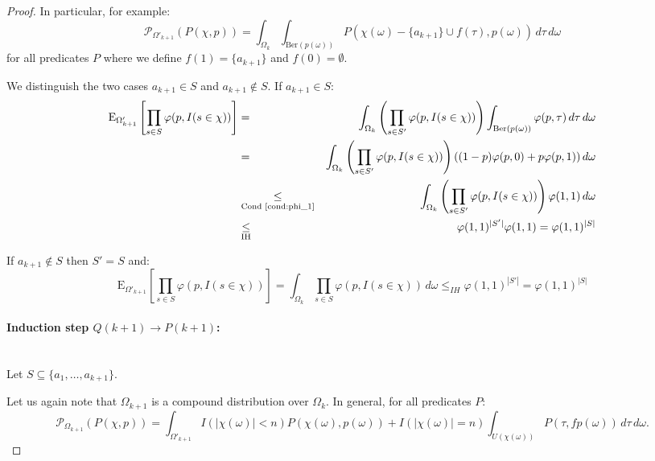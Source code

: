 \documentclass{article}
\newcommand{\prob}{\mathcal P}
\newcommand{\expectation}{\mathrm{E}}
\renewcommand{\phi}{\varphi}
\theoremstyle{definition}
\begin{document}
\begin{proof}
In particular, for example:
\[
\prob_{\Omega'_{k+1}}( P(\chi, p) ) = \int_{\Omega_k} \int_{\textrm{Ber}(p(\omega))} P(\chi(\omega)-\{a_{k+1}\}\cup f(\tau), p(\omega)) \, d \tau \, d \omega
\]
for all predicates $P$ where we define $f(1) = \{a_{k+1}\}$ and $f(0) = \emptyset$.

We distinguish the two cases $a_{k+1} \in S$ and $a_{k+1} \notin S$. If $a_{k+1} \in S$:
\begin{eqnarray*}
  \expectation_{\Omega'_{k+1}}\left[\prod_{s \in S} \phi(p, I(s \in \chi)) \right] & = & \int_{\Omega_k} \left(\prod_{s \in S'} \phi(p, I(s \in \chi))\right)
  \int_{\mathrm{Ber}(p(\omega))} \phi(p, \tau) \, d \tau \, d \omega \\
  & = & \int_{\Omega_k} \left(\prod_{s \in S'} \phi(p, I(s \in \chi))\right) ((1-p) \phi(p,0) + p \phi(p,1)) \, d \omega\\
  & \underset{\textrm{Cond~\ref{cond:phi_1}}}{\leq} & \int_{\Omega_k} \left( \prod_{s \in S'} \phi(p, I(s \in \chi)) \right)
  \phi(1,1) \, d \omega \\
  & \underset{\textrm{IH}}{\leq} & \phi(1,1)^{|S'|} \phi(1,1) = \phi(1,1)^{|S|}
\end{eqnarray*}

If $a_{k+1} \notin S$ then $S' = S$ and:
\begin{equation}
  \expectation_{\Omega'_{k+1}}\left[\prod_{s \in S} \phi(p, I(s \in \chi)) \right] = \int_{\Omega_k} \prod_{s \in S} \phi(p, I(s \in \chi)) \, d \omega \leq_{IH} \phi(1,1)^{|S'|} = \phi(1,1)^{|S|}
\end{equation}
\paragraph{Induction step $Q(k+1) \rightarrow P(k+1)$:} \phantom{.}\\
Let $S \subseteq \{ a_1, \ldots, a_{k+1} \}$.

Let us again note that $\Omega_{k+1}$ is a compound distribution over $\Omega_k$. In general, for all predicates $P$:
\[
  \prob_{\Omega_{k+1}}( P(\chi, p) )  = \int_{\Omega'_{k+1}} I( |\chi(\omega)|<n ) P(\chi(\omega),p(\omega)) + I( |\chi(\omega)|=n ) \int_{U(\chi(\omega))} P(\tau, f p(\omega)) \, d \tau  \, d \omega \textrm{.}
\]


\end{proof}
\end{document}
